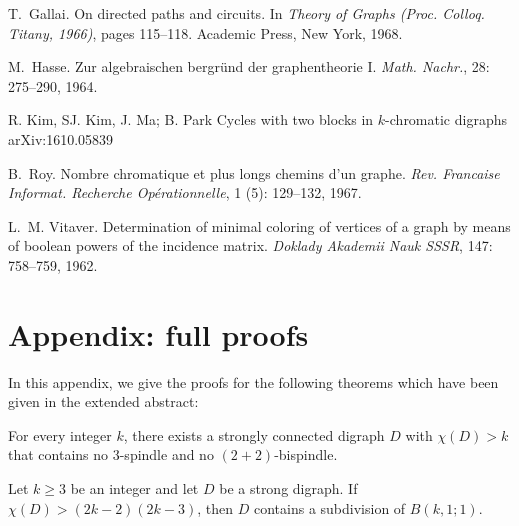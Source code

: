 \documentclass{endm}
\begin{document}
\begin{thebibliography}{10}
T.~Gallai.
\newblock On directed paths and circuits.
\newblock In \emph{Theory of Graphs (Proc. Colloq. Titany, 1966)}, pages
  115--118. Academic Press, New York, 1968.



M.~Hasse.
\newblock Zur algebraischen bergr\"und der graphentheorie {I}.
\newblock \emph{Math. Nachr.}, 28: 275--290, 1964.


R. Kim, SJ. Kim, J. Ma; B. Park
\newblock Cycles with two blocks in $k$-chromatic digraphs
\newblock arXiv:1610.05839



B.~Roy.
\newblock Nombre chromatique et plus longs chemins d'un graphe.
\newblock \emph{Rev. Francaise Informat. Recherche Op\'erationnelle},
  1 (5): 129--132, 1967.



L.~M. Vitaver.
\newblock Determination of minimal coloring of vertices of a graph by means of
  boolean powers of the incidence matrix.
\newblock \emph{Doklady Akademii Nauk SSSR}, 147: 758--759, 1962.




\end{thebibliography}

\section*{Appendix: full proofs}


In this appendix, we give the proofs for the following theorems which have been given in the extended abstract:

\begin{theorem}\label{thm:negative}
For every integer $k$, there exists a strongly connected digraph $D$ with $\chi(D) >k$ that contains no $3$-spindle and no $(2+2)$-bispindle. 
\end{theorem}

\begin{theorem}\label{th:P11k}
Let $k \geq 3$ be an integer and let $D$ be a strong digraph. If $\chi(D) >  (2k-2)(2k-3)$, then $D$ contains a subdivision of $B(k,1;1)$.
\end{theorem}
\end{document}
